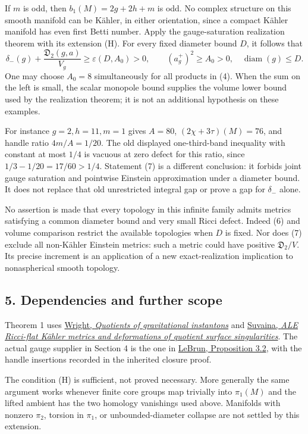 \documentclass[
  11pt,
]{article}
\begin{document}
If \(m\) is odd, then \(b_1(M)=2g+2h+m\) is odd. No complex structure on
this smooth manifold can be Kähler, in either orientation, since a
compact Kähler manifold has even first Betti number. Apply the
gauge-saturation realization theorem with its extension (H). For every
fixed diameter bound \(D\), it follows that \[
 \delta_-(g)+\frac{\mathfrak D_2(g,a)}{V_g}
       \ge\varepsilon(D,A_0)>0,
 \qquad (a_g^+)^2\ge A_0>0,\quad \operatorname{diam}(g)\le D.
 \tag{7}
\] One may choose \(A_0=8\) simultaneously for all products in (4). When
the sum on the left is small, the scalar monopole bound supplies the
volume lower bound used by the realization theorem; it is not an
additional hypothesis on these examples.

For instance \(g=2,h=11,m=1\) gives \(A=80\), \((2\chi+3\tau)(M)=76\),
and handle ratio \(4m/A=1/20\). The old displayed one-third-band
inequality with constant at most \(1/4\) is vacuous at zero defect for
this ratio, since \(1/3-1/20=17/60>1/4\). Statement (7) is a different
conclusion: it forbids joint gauge saturation and pointwise Einstein
approximation under a diameter bound. It does not replace that old
unrestricted integral gap or prove a gap for \(\delta_-\) alone.

No assertion is made that every topology in this infinite family admits
metrics satisfying a common diameter bound and very small Ricci defect.
Indeed (6) and volume comparison restrict the available topologies when
\(D\) is fixed. Nor does (7) exclude all non-Kähler Einstein metrics:
such a metric could have positive \(\mathfrak D_2/V\). Its precise
increment is an application of a new exact-realization implication to
nonaspherical smooth topology.

\hypertarget{dependencies-and-further-scope}{%
\subsection{5. Dependencies and further
scope}\label{dependencies-and-further-scope}}

Theorem 1 uses \href{https://arxiv.org/abs/1102.2442}{Wright,
\emph{Quotients of gravitational instantons}} and
\href{https://arxiv.org/abs/1102.2672}{Suvaina, \emph{ALE Ricci-flat
Kähler metrics and deformations of quotient surface singularities}}. The
actual gauge supplier in Section 4 is the one in
\href{https://arxiv.org/html/math/0003068}{LeBrun, Proposition 3.2},
with the handle insertions recorded in the inherited closure proof.

The condition (H) is sufficient, not proved necessary. More generally
the same argument works whenever finite core groups map trivially into
\(\pi_1(M)\) and the lifted ambient has the two homology vanishings used
above. Manifolds with nonzero \(\pi_2\), torsion in \(\pi_1\), or
unbounded-diameter collapse are not settled by this extension.
\end{document}
